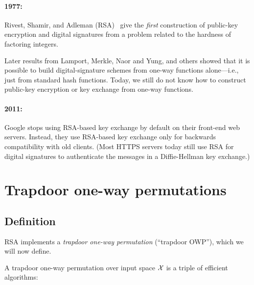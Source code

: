 \begin{itemize}
\paragraph{1977:} Rivest, Shamir, and Adleman (RSA)~\autocite{G77,RSA} give the \emph{first} construction
        of public-key encryption and digital signatures from a problem 
        related to the hardness of factoring integers.
       
        Later results from Lamport, Merkle, Naor and Yung, and others showed that 
        it is possible to build digital-signature schemes from one-way functions alone---i.e.,
        just from standard hash functions.
        Today, we still do not know how to construct public-key encryption or key exchange
        from one-way functions.

\paragraph{2011:} Google stops using RSA-based key exchange by default on their front-end web servers.
      Instead, they use RSA-based key exchange only for backwards compatibility with old clients.
      (Most HTTPS servers today still use RSA for digital signatures to authenticate
      the messages in a Diffie-Hellman key exchange.) 

\end{itemize}

\section{Trapdoor one-way permutations}

\subsection{Definition}
RSA implements a \emph{trapdoor one-way permutation} (``trapdoor OWP''), which we will now define.

A trapdoor one-way permutation over input space $\mathcal{X}$ is a triple of
efficient algorithms:

